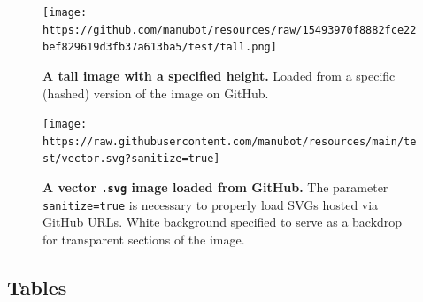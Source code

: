 \begin{figure}
\hypertarget{fig:tall-image}{%
\centering
\texttt{[image: https://github.com/manubot/resources/raw/15493970f8882fce22bef829619d3fb37a613ba5/test/tall.png]}
\caption{\textbf{A tall image with a specified height.}
Loaded from a specific (hashed) version of the image on GitHub.}\label{fig:tall-image}
}
\end{figure}

\begin{figure}
\hypertarget{fig:vector-image}{%
\centering
\texttt{[image: https://raw.githubusercontent.com/manubot/resources/main/test/vector.svg?sanitize=true]}
\caption{\textbf{A vector \texttt{.svg} image loaded from GitHub.}
The parameter \texttt{sanitize=true} is necessary to properly load SVGs hosted via GitHub URLs.
White background specified to serve as a backdrop for transparent sections of the image.}\label{fig:vector-image}
}
\end{figure}

\hypertarget{tables}{%
\subsection{Tables}\label{tables}}

